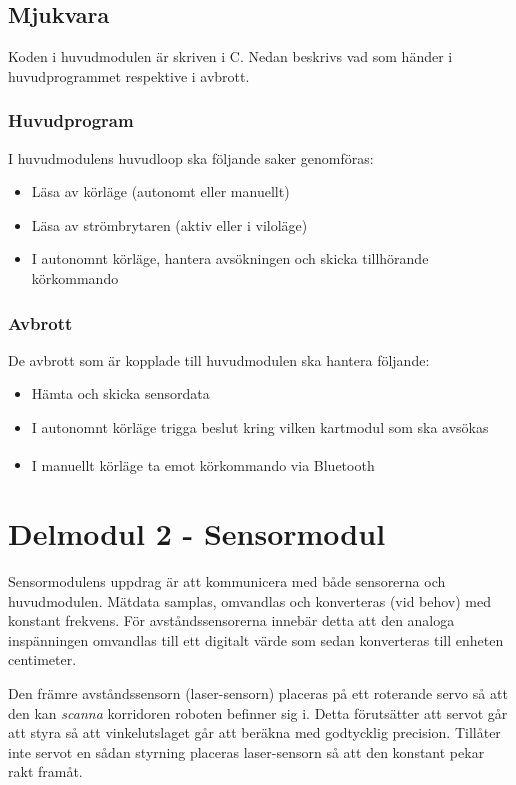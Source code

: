 \documentclass[11pt]{article}
\begin{document}
\begin{flushleft}
\subsection{Mjukvara}
Koden i huvudmodulen är skriven i C. Nedan beskrivs vad som händer i huvudprogrammet respektive i avbrott.

\subsubsection{Huvudprogram}
I huvudmodulens huvudloop ska följande saker genomföras:

\begin{itemize}
	\item Läsa av körläge (autonomt eller manuellt)
	\item Läsa av strömbrytaren (aktiv eller i viloläge)
	\item I autonomnt körläge, hantera avsökningen och skicka tillhörande körkommando
\end{itemize}

\subsubsection{Avbrott}
De avbrott som är kopplade till huvudmodulen ska hantera följande:

\begin{itemize}
	\item Hämta och skicka sensordata
	\item I autonomnt körläge trigga beslut kring vilken kartmodul som ska avsökas
	\item I manuellt körläge ta emot körkommando via Bluetooth\textsuperscript{\circledR}
\end{itemize}

\pagebreak
\section{Delmodul 2 - Sensormodul}
Sensormodulens uppdrag är att kommunicera med både sensorerna och huvudmodulen. Mätdata samplas, omvandlas och konverteras (vid behov) med konstant frekvens. För avståndssensorerna innebär detta att den analoga inspänningen omvandlas till ett digitalt värde som sedan konverteras till enheten centimeter.

Den främre avståndssensorn (laser-sensorn) placeras på ett roterande servo så att den kan \emph{scanna} korridoren roboten befinner sig i. Detta förutsätter att servot går att styra så att vinkelutslaget går att beräkna med godtycklig precision. Tillåter inte servot en sådan styrning placeras laser-sensorn så att den konstant pekar rakt framåt.


\end{flushleft}
\end{document}
